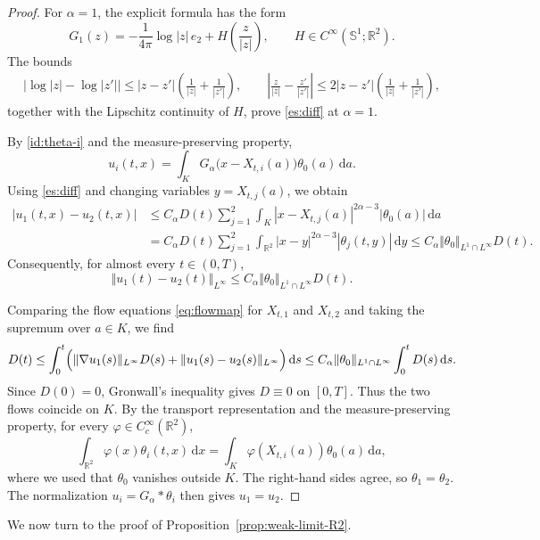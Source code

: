 \documentclass[reqno,11pt,a4paper]{amsart}
\newcommand{\dd}{\mathrm{d}}
\begin{document}
\begin{proof}
For $\alpha=1$, the explicit formula has the form
\[
  G_1(z)
  =-\frac1{4\pi}\log|z|\,e_2
   +H\left(\frac{z}{|z|}\right),
  \qquad
  H\in C^\infty(\mathbb S^1;\mathbb R^2).
\]
The bounds
\begin{align*}
  \bigl|\log|z|-\log|z'|\bigr|
  \leq
  |z-z'|\left(\frac1{|z|}+\frac1{|z'|}\right),\qquad
  \left|\frac{z}{|z|}-\frac{z'}{|z'|}\right|
  \leq
  2|z-z'|\left(\frac1{|z|}+\frac1{|z'|}\right),
\end{align*}
together with the Lipschitz continuity of $H$,
prove \eqref{es:diff} at $\alpha=1$.

By \eqref{id:theta-i} and the measure-preserving property,
\[
  u_i(t,x)
  =
  \int_K
  G_\alpha\bigl(x-X_{t,i}(a)\bigr)
  \theta_0(a)\,\dd a.
\]
Using \eqref{es:diff} and changing variables
$y=X_{t,j}(a)$, we obtain
\begin{align*}
  |u_1(t,x)-u_2(t,x)|
  &\leq C_\alpha D(t)
  \sum_{j=1}^2
  \int_K
  |x-X_{t,j}(a)|^{2\alpha-3}
  |\theta_0(a)|\,\dd a
  \\
  &=C_\alpha D(t)
  \sum_{j=1}^2
  \int_{\mathbb R^2}
  |x-y|^{2\alpha-3}|\theta_j(t,y)|\,\dd y
  \leq
  C_\alpha\Vert \theta_0\Vert _{L^1\cap L^\infty}D(t).
\end{align*}
Consequently, for almost every $t\in(0,T)$,
\[
  \Vert u_1(t)-u_2(t)\Vert _{L^\infty}
  \leq C_\alpha
  \Vert \theta_0\Vert _{L^1\cap L^\infty}D(t).
\]

Comparing the flow equations \eqref{eq:flowmap}
for $X_{t,1}$ and $X_{t,2}$
and taking the supremum over $a\in K$, we find
\begin{align*}
  D(t)
  \leq
  \int_0^t
  \Bigl(
    \Vert \nabla u_1(s)\Vert _{L^\infty}D(s)
    +\Vert u_1(s)-u_2(s)\Vert _{L^\infty}
  \Bigr)\,\dd s
  \leq
  C_\alpha\Vert \theta_0\Vert _{L^1\cap L^\infty}
  \int_0^tD(s)\,\dd s.
\end{align*}
Since $D(0)=0$, Gronwall's inequality gives
$D\equiv0$ on $[0,T]$.
Thus the two flows coincide on $K$.
By the transport representation and
the measure-preserving property, for every
$\varphi\in C_c^\infty(\mathbb R^2)$,
\[
  \int_{\mathbb R^2}\varphi(x)\theta_i(t,x)\,\dd x
  =
  \int_K
  \varphi(X_{t,i}(a))\theta_0(a)\,\dd a,
\]
where we used that $\theta_0$ vanishes outside $K$.
The right-hand sides agree, so $\theta_1=\theta_2$.
The normalization $u_i=G_\alpha*\theta_i$
then gives $u_1=u_2$.
\end{proof}

We now turn to the proof of
Proposition~\ref{prop:weak-limit-R2}.
\end{document}
